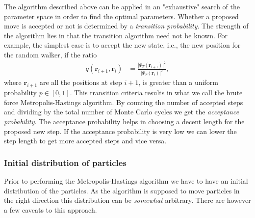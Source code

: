 \documentclass[
    a4paper, aps, twocolumn, floatfix, superscriptaddress,
    nofootinbib]{revtex4-1}
\newcommand{\vf}{\mathbf}
\newcommand{\1}{\mathds{1}}
\begin{document}
        The algorithm described above can be applied in an "exhaustive" search
        of the parameter space in order to find the optimal parameters.  Whether
        a proposed move is accepted or not is determined by a \emph{transition
        probability}. The strength of the algorithm lies in that the transition
        algorithm need not be known. For example, the simplest case is to accept
        the new state, i.e., the new position for the random walker, if the
        ratio
        \begin{align}
            q(\vf{r}_{i + 1}, \vf{r}_i)
            &=
            \frac{\left|\Psi_T(\vf{r}_{i + 1})\right|^2}
            {\left|\Psi_T(\vf{r}_{i})\right|^2},
        \end{align}
        where $\vf{r}_{i + 1}$ are all the positions at step $i + 1$, is greater
        than a uniform probability $p \in [0, 1]$. This transition criteria
        results in what we call the brute force Metropolis-Hastings algorithm.
        By counting the number of accepted steps and dividing by the total
        number of Monte Carlo cycles we get the \emph{acceptance probability}.
        The acceptance probability helps in choosing a decent length for the
        proposed new step. If the acceptance probability is very low we can
        lower the step length to get more accepted steps and vice versa.

        \subsubsection{Initial distribution of particles}
            Prior to performing the Metropolis-Hastings algorithm we have to
            have an initial distribution of the particles. As the algorithm is
            supposed to move particles in the right direction this distribution
            can be \emph{somewhat} arbitrary. There are however a few caveats to
            this approach.
\end{document}
